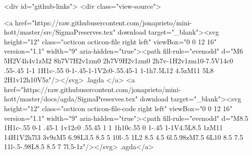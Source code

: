   <div id="github-links">
    <div class="view-source">
      
        <a href="https://raw.githubusercontent.com/jonaprieto/mini-hott/master/src/SigmaPreserves.tex" download target="_blank"><svg height="12" class="octicon octicon-file right left" viewBox="0 0 12 16" version="1.1" width="9" aria-hidden="true"><path fill-rule="evenodd" d="M6 5H2V4h4v1zM2 8h7V7H2v1zm0 2h7V9H2v1zm0 2h7v-1H2v1zm10-7.5V14c0 .55-.45 1-1 1H1c-.55 0-1-.45-1-1V2c0-.55.45-1 1-1h7.5L12 4.5zM11 5L8 2H1v12h10V5z"/></svg> .lagda </a>
        <a href="https://raw.githubusercontent.com/jonaprieto/mini-hott/master/docs/agda/SigmaPreserves.tex" download target="_blank"><svg height="12" class="octicon octicon-file-code right left" viewBox="0 0 12 16" version="1.1" width="9" aria-hidden="true"><path fill-rule="evenodd" d="M8.5 1H1c-.55 0-1 .45-1 1v12c0 .55.45 1 1 1h10c.55 0 1-.45 1-1V4.5L8.5 1zM11 14H1V2h7l3 3v9zM5 6.98L3.5 8.5 5 10l-.5 1L2 8.5 4.5 6l.5.98zM7.5 6L10 8.5 7.5 11l-.5-.98L8.5 8.5 7 7l.5-1z"/></svg> .agda</a>
      
